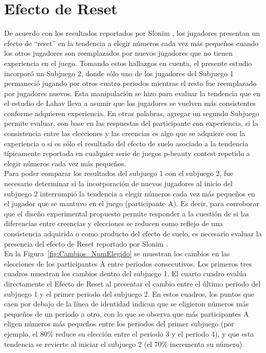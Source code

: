 \section{Efecto de Reset}

De acuerdo con los resultados reportados por Slonim \parencite*{Slonim2005}, los jugadores presentan un efecto de “reset” en la tendencia a elegir números cada vez más pequeños cuando los otros jugadores son reemplazados por nuevos jugadores que no tienen experiencia en el juego. Tomando estos hallazgos en cuenta, el presente estudio incorporó un Subjuego 2, donde sólo uno de los jugadores del Subjuego 1 permaneció jugando por otros cuatro periodos mientras el resto fue reemplazado por jugadores nuevos. Esta manipulación se hizo para evaluar la tendencia que en el estudio de Lahav \parencite*{Lahav2015} lleva a asumir que los jugadores se vuelven más consistentes conforme adquieren experiencia. En otras palabras, agregar un segundo Subjuego permite evaluar, con base en las respuestas del participante con experiencia, si la consistencia entre las elecciones y las creencias es algo que se adquiere con la experiencia o si es sólo el resultado del efecto de suelo asociado a la tendencia típicamente reportada en cualquier serie de juegos p-beauty contest repetido a elegir números cada vez más pequeños.\\

Para poder comparar los resultados del subjuego 1 con el subjuego 2, fue necesario determinar si la incorporación de nuevos jugadores al inicio del subjuego 2 interrumpió la tendencia a elegir números cada vez más pequeños en el jugador que se mantuvo en el juego (participante A). Es decir, para corroborar que el diseño experimental propuesto permite responder a la cuestión de si las diferencias entre creencias y elecciones se reducen como reflejo de una consistencia adquirida o como producto del efecto de suelo, es necesario evaluar la presencia del efecto de Reset reportado por Slonim \parencite*{Slonim2005}.\\

En la Figura~\ref{fig:Cambios_NumElegido} se muestran los cambios en las elecciones de los participantes A entre periodos consecutivos. Los primeros tres cuadros muestran los cambios dentro del subjuego 1.  El cuarto cuadro  evalúa directamente el Efecto de Reset al presentar el cambio entre el último periodo del subjuego 1 y el primer periodo del subjuego 2. En estos cuadros, los puntos que caen por debajo de la línea de identidad indican que se eligieron números más pequeños de un periodo a otro, con lo que se observa que más participantes A eligen números más pequeños entre los periodos del primer subjuego (por ejemplo, el $80\%$ reduce su elección entre el periodo 3 y el periodo 4), y que esta tendencia se revierte al iniciar el subjuego 2 (el $70\%$ incrementa su número).\\


